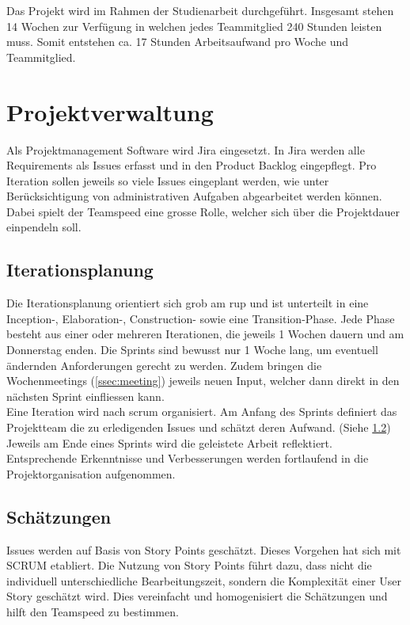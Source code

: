 \documentclass[11pt,a4paper,english,oneside]{book}
\numberwithin{equation}{chapter}
\begin{document}
	Das Projekt wird im Rahmen der Studienarbeit durchgeführt. Insgesamt stehen 14 Wochen zur Verfügung in welchen jedes Teammitglied 240 Stunden leisten muss. Somit entstehen ca. 17 Stunden Arbeitsaufwand pro Woche und Teammitglied.
		
	\section{Projektverwaltung}
	
	Als Projektmanagement Software wird Jira \cite{jira} eingesetzt. In Jira werden alle Requirements als Issues erfasst und in den Product Backlog eingepflegt. Pro Iteration sollen jeweils so viele Issues eingeplant werden, wie unter Berücksichtigung von administrativen Aufgaben abgearbeitet werden können. Dabei spielt der Teamspeed eine grosse Rolle, welcher sich über die Projektdauer einpendeln soll. 

	
	\subsection{Iterationsplanung}
	Die Iterationsplanung orientiert sich grob am \gls{rup} und ist unterteilt in eine Inception-, Elaboration-, Construction- sowie eine Transition-Phase. Jede Phase besteht aus einer oder mehreren Iterationen, die jeweils 1 Wochen dauern und am Donnerstag enden. Die Sprints sind bewusst nur 1 Woche lang, um eventuell ändernden Anforderungen gerecht zu werden. Zudem bringen die Wochenmeetings (\ref{ssec:meeting}) jeweils neuen Input, welcher dann direkt in den nächsten Sprint einfliessen kann.\\
	Eine Iteration wird nach \gls{scrum} organisiert. Am Anfang des Sprints definiert das Projektteam die zu erledigenden Issues und schätzt deren Aufwand. (Siehe \ref{sec:estimations}) Jeweils am Ende eines Sprints wird die geleistete Arbeit reflektiert. Entsprechende Erkenntnisse und Verbesserungen werden fortlaufend in die Projektorganisation aufgenommen. 
		
	\subsection{Schätzungen}
	\label{sec:estimations}
	Issues werden auf Basis von Story Points geschätzt. Dieses Vorgehen hat sich mit SCRUM etabliert. Die Nutzung von Story Points führt dazu, dass nicht die individuell unterschiedliche Bearbeitungszeit, sondern die Komplexität einer User Story geschätzt wird. Dies vereinfacht  und homogenisiert die Schätzungen und hilft den Teamspeed zu bestimmen.\cite{storypoints, storypoints2}
	
\end{document}
